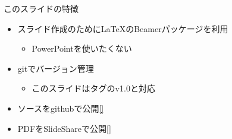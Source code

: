 \begin{frame}{このスライドの特徴}
 \begin{itemize}
  \item スライド作成のために\LaTeX のBeamerパッケージを利用
        \begin{itemize}
         \item PowerPointを使いたくない
        \end{itemize}
  \item gitでバージョン管理
        \begin{itemize}
         \item このスライドはタグのv1.0と対応
        \end{itemize}
  \item ソースをgithubで公開\href{https://github.com/sakabar/prml_titech_2-3-1_2-3-7}{[]}
  \item PDFをSlideShareで公開\href{http://www.slideshare.net/takafumisakakibara75/slide-41820194}{[]}
 \end{itemize}
\end{frame}
